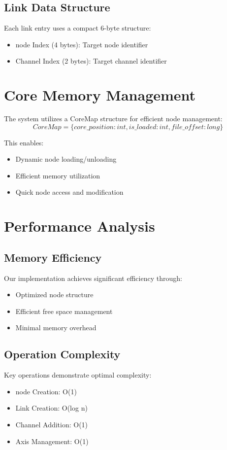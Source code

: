 \subsection{Link Data Structure}
Each link entry uses a compact 6-byte structure:
\begin{itemize}
    \item node Index (4 bytes): Target node identifier
    \item Channel Index (2 bytes): Target channel identifier
\end{itemize}

\section{Core Memory Management}\label{Sec:CoreMemory}
The system utilizes a CoreMap structure for efficient node management:
\begin{equation}
    CoreMap = \{core\_position: int, is\_loaded: int, file\_offset: long\}
\end{equation}

This enables:
\begin{itemize}
    \item Dynamic node loading/unloading
    \item Efficient memory utilization
    \item Quick node access and modification
\end{itemize}

\section{Performance Analysis}\label{Sec:Performance}
\subsection{Memory Efficiency}
Our implementation achieves significant efficiency through:
\begin{itemize}
    \item Optimized node structure
    \item Efficient free space management
    \item Minimal memory overhead
\end{itemize}

\subsection{Operation Complexity}
Key operations demonstrate optimal complexity:
\begin{itemize}
    \item node Creation: O(1)
    \item Link Creation: O(log n)
    \item Channel Addition: O(1)
    \item Axis Management: O(1)
\end{itemize}

